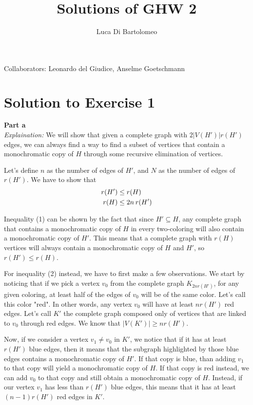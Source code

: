 \documentclass[a4paper,german]{article}
\title{Solutions of GHW 2}
\author{Luca Di Bartolomeo}
\date{}
\begin{document}
\maketitle

{
	\centering
	Collaborators: Leonardo del Giudice, Anselme Goetschmann

}

\section*{Solution to Exercise 1}

\textbf{Part a} \\
\emph{Explaination:} 
We will show that given a complete graph with $2|V(H')|r(H')$ edges, we can always find a way to 
find a subset of vertices that contain a monochromatic copy of $H$ through some recursive elimination
of vertices.
\vspace{1em}

Let's define $n$ as the number of edges of $H'$, and $N$ as the number of edges of $r(H')$. We have to show that
\begin{align}
	r(H') &\leq r(H) \\
	r(H) &\leq 2n \hspace{0.2em} r(H')
\end{align}

Inequality (1) can be shown by the fact that since $H' \subseteq H$, any complete graph that contains
a monochromatic copy of $H$ in every two-coloring will also contain a monochromatic copy of $H'$.
This means that a complete graph with $r(H)$ vertices will always contain a monochromatic copy of 
$H$ and $H'$, so $r(H') \leq r(H)$.


For inequality (2) instead, we have to first make a few observations.
We start by noticing that if we pick a vertex $v_0$ from the complete graph $K_{2nr(H')}$, for
any given coloring, at least half of the edges of $v_0$ will be of the same color.
Let's call this color "red". In other words, any vertex $v_0$ will have at least $nr(H')$ red edges.
Let's call $K'$ the complete graph composed only of vertices that are linked to $v_0$ through red edges.
We know that $|V(K')| \geq nr(H')$.

Now, if we consider a vertex $v_1 \neq v_0$ in $K'$, we notice that if it has at least $r(H')$ blue edges, 
then it means that the subgraph highlighted by those blue edges contains a monochromatic copy of $H'$. 
If that copy is blue, than adding $v_1$ to that copy will yield a monochromatic copy of $H$. If that 
copy is red instead, we can add $v_0$ to that copy and still obtain a monochromatic copy of $H$.
Instead, if our vertex $v_1$ has less than $r(H')$ blue edges, this means that it has at least 
$(n-1)r(H')$ red edges in $K'$. 
\end{document}
